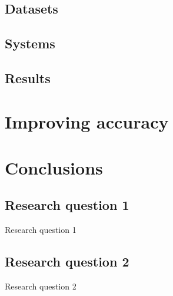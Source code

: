 \documentclass[pdf]{beamer}
\begin{document}
\subsection{Datasets}
\subsection{Systems}
\subsection{Results}

\section{Improving accuracy}

\section{Conclusions}
\subsection{Research question 1}
\begin{frame}{Research question 1}
\end{frame}

\subsection{Research question 2}
\begin{frame}{Research question 2}

\end{frame}
\end{document}
